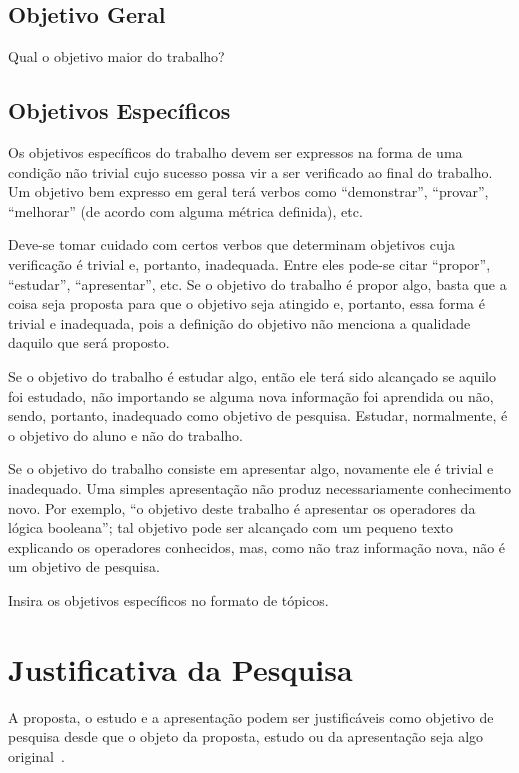 \documentclass[
    12pt,				       %
    openright,			       %
    oneside,			       %
    a4paper,			       %
    chapter=TITLE,             %
    sumario=tradicional,       %
    english,			        %
    brazil, 				    %
 ]{abntex2}
\begin{document}
\subsection{Objetivo Geral}\label{sec:ObjGeral}
Qual o objetivo maior do trabalho?

\subsection{Objetivos Específicos}\label{sec:ObjEspec}
Os objetivos específicos do trabalho devem ser expressos na forma de uma condição não trivial cujo sucesso possa vir a ser verificado ao final do trabalho. Um objetivo bem expresso em geral terá verbos como “demonstrar”, “provar”, “melhorar” (de acordo com alguma métrica definida), etc.

Deve-se tomar cuidado com certos verbos que determinam objetivos cuja verificação é trivial e, portanto, inadequada. Entre eles pode-se citar “propor”, “estudar”, “apresentar”, etc. Se o objetivo do trabalho é propor algo, basta que a coisa seja proposta para que o objetivo seja atingido e, portanto, essa forma é trivial e inadequada, pois a definição do objetivo não menciona a qualidade daquilo que será proposto.

Se o objetivo do trabalho é estudar algo, então ele terá sido alcançado se aquilo foi estudado, não importando se alguma nova informação foi aprendida ou não, sendo, portanto, inadequado como objetivo de pesquisa. Estudar, normalmente, é o objetivo do aluno e não do trabalho.

Se o objetivo do trabalho consiste em apresentar algo, novamente ele é trivial e inadequado. Uma simples apresentação não produz necessariamente conhecimento novo. Por exemplo, “o objetivo deste trabalho é apresentar os operadores da lógica booleana”; tal objetivo pode ser alcançado com um pequeno texto explicando os operadores conhecidos, mas, como não traz informação nova, não é um objetivo de pesquisa.

Insira os objetivos específicos no formato de tópicos.

\section{Justificativa da Pesquisa}\label{sec:Justificativa}
A proposta, o estudo e a apresentação podem ser justificáveis como objetivo de pesquisa desde que o objeto da proposta, estudo ou da apresentação seja algo original~\cite{wazlawick2009}.
\end{document}
